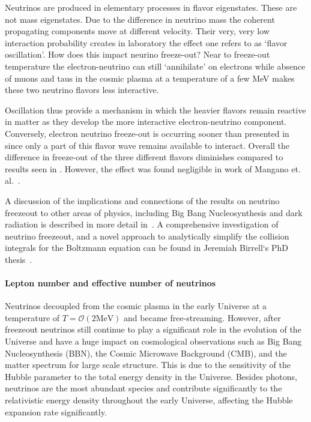 
Neutrinos are produced in elementary processes in flavor eigenstates. These are not mass eigenstates. Due to the difference in neutrino mass the coherent propagating components move at different velocity. Their very, very low interaction probability creates in laboratory the effect one refers to as `flavor oscillation'. How does this impact neurino freeze-out? Near to freeze-out temperature the electron-neutrino can still `annihilate' on electrons while absence of muons and taus in the cosmic plasma at a temperature of a few MeV makes these two neutrino flavors less interactive. 

Oscillation thus provide a mechanism in which the heavier flavors remain reactive in matter as they develop the more interactive electron-neutrino component. Conversely, electron neutrino freeze-out is occurring sooner than presented in  since only a part of this flavor wave remains available to interact. Overall the difference in freeze-out of the three different flavors diminishes compared to results seen in . However, the effect was found negligible in work of Mangano et. al.~\cite{Mangano:2005cc}.

A discussion of the implications and connections of the results on neutrino freezeout to other areas of physics, including Big Bang Nucleosynthesis and dark radiation is described in more detail in~\cite{Dreiner:2011fp,Boehm:2012gr,Blennow:2012de,Birrell:2014uka}. A comprehensive investigation of neutrino freezeout, and a novel approach to analytically simplify the collision integrals for the Boltzmann equation can be found in Jeremiah Birrell‘s PhD thesis~\cite{Birrell:2014ona}. 

\paragraph{Lepton number and effective number of neutrinos}\label{sec:N_eff_intro}

Neutrinos decoupled from the cosmic plasma in the early Universe at a temperature of $T=\mathcal{O}(2\mathrm{MeV})$ and became free-streaming. However, after freezeout neutrinos still continue to play a significant role in the evolution of the Universe and have a huge impact on cosmological observations such as Big Bang Nucleosynthesis (BBN), the Cosmic Microwave Background (CMB), and the matter spectrum for large scale structure. This is due to the sensitivity of the Hubble parameter to the total energy density in the Universe. Besides photons, neutrinos are the most abundant species and contribute significantly to the relativistic energy density throughout the early Universe, affecting the Hubble expansion rate significantly. 

